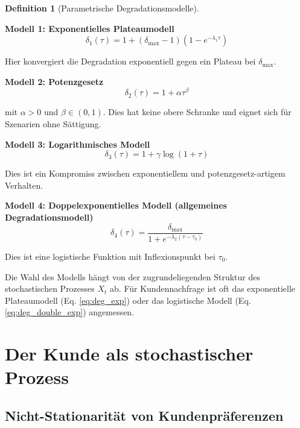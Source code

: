 \documentclass[a4paper, 12pt, twoside, openright]{report}
\theoremstyle{definition}
\newtheorem{definition}[theorem]{Definition}
\theoremstyle{definition}
\begin{document}
\begin{definition}[Parametrische Degradationsmodelle]
\label{def:degradation_forms}

\textbf{Modell 1: Exponentielles Plateaumodell}
\begin{equation}
\delta_1(\tau) = 1 + (\delta_{\max} - 1)(1 - e^{-\lambda_1 \tau})
\label{eq:deg_exp}
\end{equation}

Hier konvergiert die Degradation exponentiell gegen ein Plateau bei $\delta_{\max}$.

\textbf{Modell 2: Potenzgesetz}
\begin{equation}
\delta_2(\tau) = 1 + \alpha \tau^{\beta}
\label{eq:deg_power}
\end{equation}

mit $\alpha > 0$ und $\beta \in (0,1)$. Dies hat keine obere Schranke und eignet sich für Szenarien ohne Sättigung.

\textbf{Modell 3: Logarithmisches Modell}
\begin{equation}
\delta_3(\tau) = 1 + \gamma \log(1 + \tau)
\label{eq:deg_log}
\end{equation}

Dies ist ein Kompromiss zwischen exponentiellem und potenzgesetz-artigem Verhalten.

\textbf{Modell 4: Doppelexponentielles Modell (allgemeines Degradationsmodell)}
\begin{equation}
\delta_4(\tau) = \frac{\delta_{\max}}{1 + e^{-\lambda_2(\tau - \tau_0)}}
\label{eq:deg_double_exp}
\end{equation}

Dies ist eine logistische Funktion mit Inflexionspunkt bei $\tau_0$.

\end{definition}

Die Wahl des Modells hängt von der zugrundeliegenden Struktur des stochastischen Prozesses $X_t$ ab. Für Kundennachfrage ist oft das exponentielle Plateaumodell (Eq. \ref{eq:deg_exp}) oder das logistische Modell (Eq. \ref{eq:deg_double_exp}) angemessen.

\section{Der Kunde als stochastischer Prozess}
\label{sec:kunde}

\subsection{Nicht-Stationarität von Kundenpräferenzen}
\end{document}
